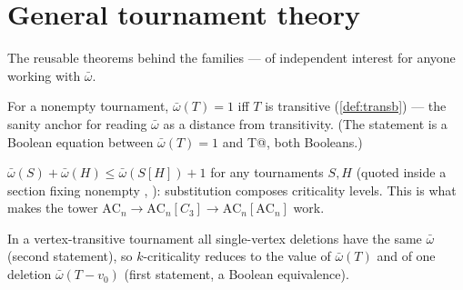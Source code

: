 \chapter{General tournament theory}
\label{ch:general}

The reusable theorems behind the families --- of independent interest
for anyone working with $\bar\omega$.




\begin{decoded}
For a nonempty tournament, $\bar\omega(T) = 1$ iff $T$ is transitive
(\cref{def:transb}) --- the sanity anchor for reading $\bar\omega$ as
a distance from transitivity. (The statement is a Boolean equation
between $\bar\omega(T) = 1$ and \rocqinline@transb T@,
both Booleans.)
\end{decoded}






\begin{decoded}
$\bar\omega(S) + \bar\omega(H) \le \bar\omega(S[H]) + 1$ for any
tournaments $S, H$ (quoted inside a section fixing nonempty
\rocqinline@S@, \rocqinline@H@): substitution composes criticality
levels. This is what makes the tower $\mathrm{AC}_n \to
\mathrm{AC}_n[C_3] \to \mathrm{AC}_n[\mathrm{AC}_n]$ work.
\end{decoded}






\label{res:omegabar_del_vt}

\begin{decoded}
In a vertex-transitive tournament all single-vertex deletions have
the same $\bar\omega$ (second statement), so $k$-criticality reduces
to the value of $\bar\omega(T)$ and of one deletion
$\bar\omega(T - v_0)$ (first statement, a Boolean equivalence).
\end{decoded}



